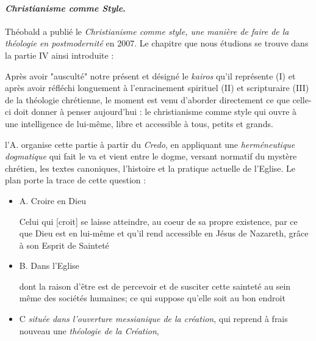 \paragraph{\textit{Christianisme comme Style}.} Théobald a publié le \textit{Christianisme comme style, une manière de faire de la théologie en postmodernité}\cite{theobald_christianisme_2007} en 2007. Le chapitre que nous étudions se trouve dans la partie IV ainsi introduite : 

 \begin{singlequote}
     Après avoir "ausculté" notre présent et désigné le \textit{kairos} qu'il représente (I) et après avoir réfléchi longuement à l'enracinement spirituel (II) et scripturaire (III) de la théologie chrétienne, le moment est venu d'aborder directement ce que celle-ci doit donner à penser aujourd'hui : le christianisme comme style qui ouvre à une intelligence de lui-même, libre et accessible à tous, petits et grands. 
     \cite[p 699]{theobald_christianisme_2007}
 \end{singlequote}
 
l'A. organise cette partie à partir du \textit{Credo}, en appliquant une \textit{herméneutique dogmatique} \cite[p. 700]{theobald_christianisme_2007}  qui fait le va et vient entre le dogme, versant normatif du mystère chrétien, les textes canoniques, l'histoire et la pratique actuelle de l'Eglise. Le plan porte la trace de cette question : 
\begin{itemize}
    \item A. Croire en Dieu
    \begin{singlequote}
        Celui qui [croit] se laisse atteindre, au coeur de sa propre existence, par ce que Dieu est en lui-même et qu'il rend accessible en Jésus de Nazareth, grâce à son Esprit de Sainteté \cite[p. 699]{theobald_christianisme_2007}
    \end{singlequote}
    \item  B. Dans l'Eglise 
    \begin{singlequote}
        dont la raison d'être est de percevoir et de susciter cette sainteté au sein même des sociétés humaines; ce qui suppose qu'elle soit au bon endroit \cite[p. 699]{theobald_christianisme_2007}
    \end{singlequote} 
    \item C \textit{située dans l'ouverture  messianique de la création}, qui reprend à frais nouveau une \textit{théologie de la Création}, 
\end{itemize}
 
